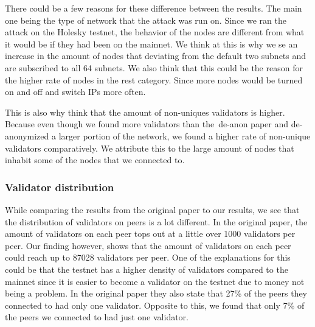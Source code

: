 There could be a few reasons for these difference between the results.
The main one being the type of network that the attack was run on.
Since we ran the attack on the Holesky testnet, the behavior of the nodes are different from what it would be if they had been on the mainnet.
We think at this is why we se an increase in the amount of nodes that deviating from the default two subnets and are subscribed to all 64 subnets.
We also think that this could be the reason for the higher rate of nodes in the rest category.
Since more nodes would be turned on and off and switch IPs more often.


This is also why think that the amount of non-uniques validators is higher.
Because even though we found more validators than the~\gls{de-anon paper} and de-anonymized a larger portion of the network, we found a higher rate of non-unique validators comparatively.
We attribute this to the large amount of nodes that inhabit some of the nodes that we connected to.



\subsubsection{Validator distribution}\label{subsubsec:validator-distribution}
While comparing the results from the original paper to our results, we see that the distribution of validators on peers is a lot different.
In the original paper, the amount of validators on each peer tops out at a little over 1000 validators per peer.
Our finding however, shows that the amount of validators on each peer could reach up to 87028 validators per peer.
One of the explanations for this could be that the testnet has a higher density of validators compared to the mainnet since it is easier to become a validator on the testnet due to money not being a problem.
In the original paper they also state that 27\% of the peers they connected to had only one validator.
Opposite to this, we found that only 7\% of the peers we connected to had just one validator.
